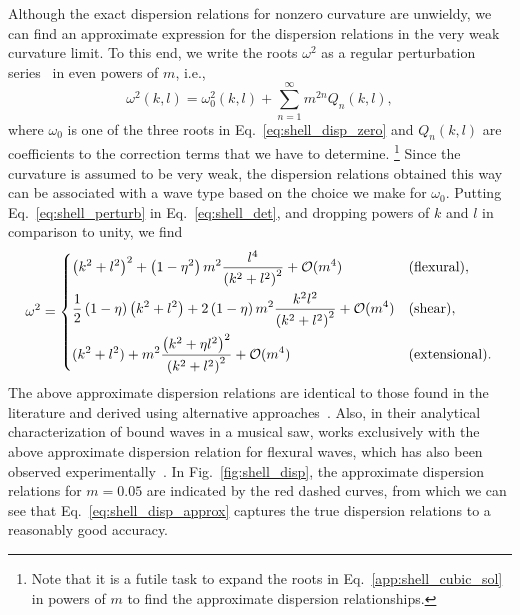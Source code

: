 Although the exact dispersion relations for nonzero curvature are unwieldy, we can find an approximate expression for the dispersion relations in the very weak curvature limit.
To this end, we write the roots $\omega^{2}$ as a regular perturbation series~\cite{bender1978} in even powers of $m$, i.e.,
%
\begin{equation}
  \omega^{2}(k, l) = \omega^{2}_{0}(k, l) + \sum_{n = 1}^{\infty} m^{2n}Q_{n}(k, l),
  \label{eq:shell_perturb}
\end{equation}
%
where $\omega_{0}$ is one of the three roots in Eq.~\eqref{eq:shell_disp_zero} and $Q_{n}(k, l)$ are coefficients to the correction terms that we have to determine.%
\footnote{Note that it is a futile task to expand the roots in Eq.~\eqref{app:shell_cubic_sol} in powers of $m$ to find the approximate dispersion relationships.}
Since the curvature is assumed to be very weak, the dispersion relations obtained this way can be associated with a wave type based on the choice we make for $\omega_{0}$.
Putting Eq.~\eqref{eq:shell_perturb} in Eq.~\eqref{eq:shell_det}, and dropping powers of $k$ and $l$ in comparison to unity, we find
%
\begin{equation}
  \omega^{2} =
  \begin{dcases}
    \left(k^{2} + l^{2}\right)^{2} + \left(1 - \eta^{2}\right)m^{2}\frac{l^{4}}{\left(k^{2} + l^{2}\right)^{2}} + \mathcal{O}(m^{4}) & \text{(flexural)}, \\
    \frac{1}{2}\left(1-\eta\right)\left(k^{2} + l^{2}\right) + 2\left(1 - \eta\right)m^{2}\frac{k^{2}l^{2}}{\left(k^{2} + l^{2}\right)^{2}} + \mathcal{O}(m^{4}) & \text{(shear)},\\
    (k^{2} + l^{2}) + m^{2}\frac{\left(k^{2} + \eta l^{2}\right)^{2}}{\left(k^{2} + l^{2}\right)^{2}} + \mathcal{O}(m^{4}) & \text{(extensional)}.
  \end{dcases}
  \label{eq:shell_disp_approx}
\end{equation}
%
The above approximate dispersion relations are identical to those found in the literature and derived using alternative approaches~\cite{germogenova1973,pierce1993,norris1994,rebinsky1996}.
Also, in their analytical characterization of bound waves in a musical saw, \citet{shankar2022} works exclusively with the above approximate dispersion relation for flexural waves, which has also been observed experimentally~\cite{williams1990}.
In Fig.~\ref{fig:shell_disp}, the approximate dispersion relations for $m = 0.05$ are indicated by the red dashed curves, from which we can see that Eq.~\eqref{eq:shell_disp_approx} captures the true dispersion relations to a reasonably good accuracy.

